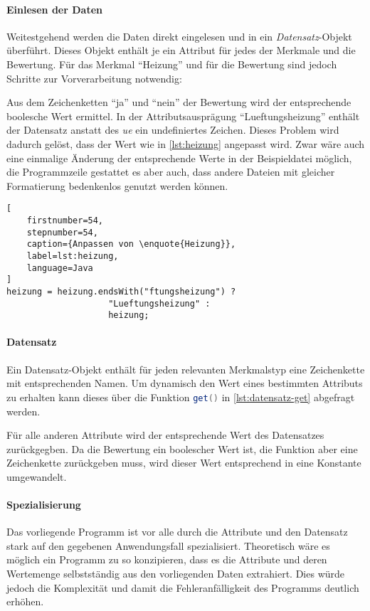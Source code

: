 \paragraph{Einlesen der Daten}
Weitestgehend werden die Daten direkt eingelesen und in ein \emph{Datensatz}-Objekt überführt.
Dieses Objekt enthält je ein Attribut für jedes der Merkmale und die Bewertung.
Für das Merkmal \enquote{Heizung} und für die Bewertung sind jedoch Schritte zur Vorverarbeitung notwendig:

Aus dem Zeichenketten \enquote{ja} und \enquote{nein} der Bewertung wird der entsprechende boolesche Wert ermittel.
In der Attributsausprägung \enquote{Lueftungsheizung} enthält der Datensatz anstatt des \textit{ue} ein undefiniertes Zeichen.
Dieses Problem wird dadurch gelöst, dass der Wert wie in \autoref{lst:heizung} angepasst wird.
Zwar wäre auch eine einmalige Änderung der entsprechende Werte in der Beispieldatei möglich,
die Programmzeile gestattet es aber auch, dass andere Dateien mit gleicher Formatierung bedenkenlos genutzt werden können.

\begin{lstlisting}[
    firstnumber=54,
    stepnumber=54,
    caption={Anpassen von \enquote{Heizung}},
    label=lst:heizung,
    language=Java
]
heizung = heizung.endsWith("ftungsheizung") ?
                    "Lueftungsheizung" :
                    heizung;
\end{lstlisting}

\paragraph{Datensatz}
Ein Datensatz-Objekt enthält für jeden relevanten Merkmalstyp eine Zeichenkette mit entsprechenden Namen.
Um dynamisch den Wert eines bestimmten Attributs zu erhalten kann dieses über die Funktion \lstinline[language=Java]{get()}
in \autoref{lst:datensatz-get} abgefragt werden.



Für alle anderen Attribute wird der entsprechende Wert des Datensatzes zurückgegben.
Da die Bewertung ein boolescher Wert ist, die Funktion aber eine Zeichenkette zurückgeben muss,
wird dieser Wert entsprechend in eine Konstante umgewandelt.

\paragraph{Spezialisierung}
Das vorliegende Programm ist vor alle durch die Attribute und den Datensatz stark auf den gegebenen Anwendungsfall spezialisiert.
Theoretisch wäre es möglich ein Programm zu so konzipieren, dass es die Attribute und deren Wertemenge selbstständig aus den vorliegenden Daten extrahiert.
Dies würde jedoch die Komplexität und damit die Fehleranfälligkeit des Programms deutlich erhöhen.

